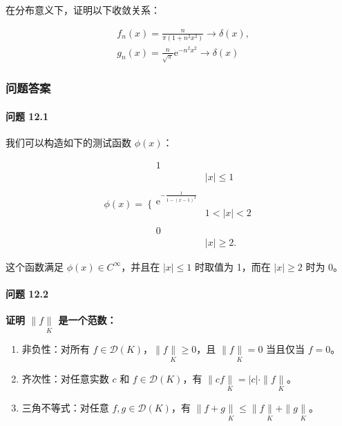 在分布意义下，证明以下收敛关系：

\[\begin{aligned}
 & f_{n}(x) = \frac{n}{\pi\left( 1 + n^{2}x^{2} \right)} \rightarrow \delta(x), \\
 & g_{n}(x) = \frac{n}{\sqrt{\pi}}\mathrm{e}^{- n^{2}x^{2}} \rightarrow \delta(x)
\end{aligned}\]

\subsubsection{问题答案}\label{ux95eeux9898ux7b54ux6848}

\paragraph{问题 12.1}\label{ux95eeux9898-12.1}

我们可以构造如下的测试函数 \(\phi(x)\)：

\[\phi(x) = \left. \ \{\begin{array}{ll}
1 \\
 & |x| \leq 1 \\
 \\
\mathrm{e}^{- \frac{1}{1 - (x - 1)^{2}}} \\
 & 1 < |x| < 2 \\
 \\
0 \\
 & |x| \geq 2.
\end{array} \right.\]

这个函数满足 \(\phi(x) \in C^{\infty}\)，并且在 \(|x| \leq 1\) 时取值为
1，而在 \(|x| \geq 2\) 时为 0。

\paragraph{问题 12.2}\label{ux95eeux9898-12.2}

\textbf{证明 \(\parallel f\underset{K}{\parallel}\) 是一个范数：}

\begin{enumerate}
\def\labelenumi{(\alph{enumi})}
\item
  非负性：对所有
  \(f \in \mathcal{D}(K)\)，\(\parallel f\underset{K}{\parallel} \geq 0\)，且
  \(\parallel f\underset{K}{\parallel} = 0\) 当且仅当 \(f = 0\)。
\item
  齐次性：对任意实数 \(c\) 和 \(f \in \mathcal{D}(K)\)，有
  \(\parallel cf\underset{K}{\parallel} = |c| \cdot \parallel f\underset{K}{\parallel}\)。
\item
  三角不等式：对任意 \(f,g \in \mathcal{D}(K)\)，有
  \(\parallel f + g\underset{K}{\parallel} \leq \parallel f\underset{K}{\parallel} + \parallel g\underset{K}{\parallel}\)。
\end{enumerate}

